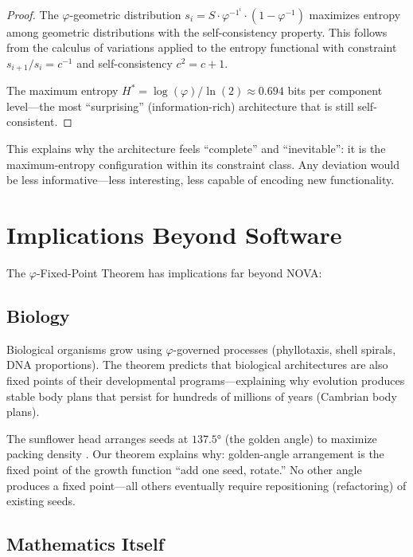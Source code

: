 \documentclass[12pt]{article}
\newcommand{\PHI}{\varphi}
\newcommand{\PHIINV}{\varphi^{-1}}
\begin{document}
\begin{proof}
The $\PHI$-geometric distribution $s_i = S \cdot \PHIINV^i \cdot (1 - \PHIINV)$ maximizes entropy among geometric distributions with the self-consistency property. This follows from the calculus of variations applied to the entropy functional with constraint $s_{i+1}/s_i = c^{-1}$ and self-consistency $c^2 = c + 1$.

The maximum entropy $H^* = \log(\PHI) / \ln(2) \approx 0.694$ bits per component level—the most ``surprising'' (information-rich) architecture that is still self-consistent.
\end{proof}

This explains why the architecture feels ``complete'' and ``inevitable'': it is the maximum-entropy configuration within its constraint class. Any deviation would be less informative—less interesting, less capable of encoding new functionality.

\section{Implications Beyond Software}

The $\PHI$-Fixed-Point Theorem has implications far beyond NOVA:

\subsection{Biology}

Biological organisms grow using $\PHI$-governed processes (phyllotaxis, shell spirals, DNA proportions). The theorem predicts that biological architectures are also fixed points of their developmental programs—explaining why evolution produces stable body plans that persist for hundreds of millions of years (Cambrian body plans).

The sunflower head arranges seeds at $137.5°$ (the golden angle) to maximize packing density \cite{vogel1979better}. Our theorem explains why: golden-angle arrangement is the fixed point of the growth function ``add one seed, rotate.'' No other angle produces a fixed point—all others eventually require repositioning (refactoring) of existing seeds.

\subsection{Mathematics Itself}
\end{document}
